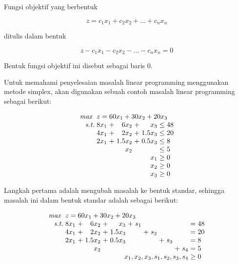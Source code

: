 Fungsi objektif yang berbentuk

\begin{equation*}
	z = c_1x_1 + c_2x_2 + \dots + c_nx_n
\end{equation*}

ditulis dalam bentuk

\begin{equation*}
	z - c_1x_1 - c_2x_2 - \dots - c_nx_n = 0
\end{equation*}

Bentuk fungsi objektif ini disebut sebagai baris 0.

Untuk memahami penyelesaian masalah linear programming menggunakan metode simplex, akan digunakan sebuah contoh masalah linear programming sebagai berikut:

\begin{equation*}
	\setlength\arraycolsep{1.5pt}
	\begin{array}{r r c r c r c l}
		\textit{max } &\multicolumn{7}{l}{z = 60x_1 + 30x_2 + 20x_3}\\
		\textit{s.t.} &8x_1 &+ &6x_2 &+ &x_3 &\leq &48\\
		&4x_1 &+ &2x_2 &+ &1.5x_3 &\leq &20\\
		&2x_1 &+ &1.5x_2 &+ &0.5x_3 &\leq &8\\
		&&&x_2 &&&\leq &5\\
		&&&&&x_1 &\geq &0\\
		&&&&&x_2 &\geq &0\\
		&&&&&x_3 &\geq &0\\
	\end{array}
\end{equation*}

Langkah pertama adalah mengubah masalah ke bentuk standar, sehingga masalah ini dalam bentuk standar adalah sebagai berikut:

\begin{equation*}
	\setlength\arraycolsep{1.5pt}
	\begin{array}{r r c r c r c r c r c r c r c l}
		\textit{max } &\multicolumn{15}{l}{z = 60x_1 + 30x_2 + 20x_3}\\
		\textit{s.t.} &8x_1 &+ &6x_2 &+ &x_3 &+ &s_1 &&&&&&&= &48\\
		&4x_1 &+ &2x_2 &+ &1.5x_3 &&&+ &s_2 &&&&&= &20\\
		&2x_1 &+ &1.5x_2 &+ &0.5x_3 &&&&&+ &s_3 &&&= &8\\
		&&&x_2 && &&&&&&&+ &s_4 &= &5\\
		\multicolumn{14}{r}{x_1, x_2, x_3, s_1, s_2, s_3, s_4} &\geq &0\\
	\end{array}
\end{equation*}

